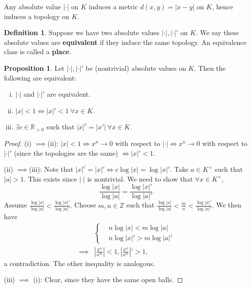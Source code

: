 \documentclass{article}
\theoremstyle{definition}
\newtheorem{prop}[theorem]{Proposition}
\newtheorem{defn}{Definition}[section]
\begin{document}
Any absolute value $|\cdot |$ on $K$ induces a metric $d(x,y) = |x-y|$ on $K$, hence induces a topology on $K$.

\begin{defn}
    Suppose we have two absolute values $|\cdot |, |\cdot |'$ on $K$. We say these absolute values are \textbf{equivalent} if they induce the same topology. An equivalence class is called a \textbf{place}.
\end{defn}
\begin{prop}
    Let $|\cdot|, |\cdot|'$ be (nontrivial) absolute values on $K$. Then the following are equivalent:
    \begin{enumerate}[(i)]
        \item $|\cdot|$ and $|\cdot|'$ are equivalent.
        \item $|x| < 1 \iff |x|' < 1 ~\forall x \in K$.
        \item $\exists c \in \mathbb{R}_{>0}$ such that $|x|^c = |x'| ~\forall x \in K$.
    \end{enumerate}
\end{prop}
\begin{proof}
    (i) $\implies $(ii): $|x|<1 \iff x^n \to 0$ with respect to $|\cdot| \iff x^n \to 0$ with respect to $|\cdot|'$ (since the topologies are the same) $\iff |x|'<1$. 
    \vspace{1mm}
     
    (ii) $\implies $(iii): Note that $|x|^c = |x|' \iff c \log |x| = \log |x|'$. Take $a \in K^\times$ such that $|a| > 1$. This exists since $|\cdot|$ is nontrivial. We need to show that $\forall x \in K^\times,$\[
     \frac{\log |x|}{\log |a|} = \frac{\log|x|'}{\log|a|'}.
    \]
    Assume $\frac{\log |x|}{\log |a|} < \frac{\log|x|'}{\log|a|'}.$ Choose $m, n \in \mathbb{Z}$ such that $\frac{\log |x|}{\log |a|} < \frac{m}{n} < \frac{\log|x|'}{\log|a|'}.$ We then have 
    \begin{align*}
        &\begin{cases}
            &n \log |x| < m \log |a|\\
            &n \log |x|' > m \log|a|'
        \end{cases}\\
        \implies & \left|\frac{x^n}{a^m}\right|<1, \left|\frac{x^n}{a^m}\right|' > 1,
    \end{align*}
    a contradiction. The other inequality is analogous.
    \vspace{1mm}
     
    (iii) $\implies$ (i): Clear, since they have the same open balls.
\end{proof}
\end{document}
